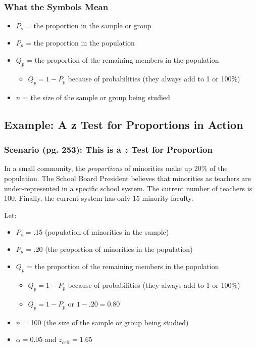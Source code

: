 \documentclass[]{article}
\begin{document}
\subsubsection{What the Symbols Mean}\label{what-the-symbols-mean}

\begin{itemize}
\itemsep1pt\parskip0pt
\item
  $P_s$ = the proportion in the sample or group
\item
  $P_p$ = the proportion in the population
\item
  $Q_p$ = the proportion of the remaining members in the population

  \begin{itemize}
  \itemsep1pt\parskip0pt
  \item
    $Q_p = 1-P_p$ because of probabilities (they always add to 1 or
    100\%)
  \end{itemize}
\item
  $n$ = the size of the sample or group being studied
\end{itemize}

\subsection{Example: A z Test for Proportions in
Action}\label{example-a-z-test-for-proportions-in-action}

\subsubsection{Scenario (pg. 253): This is a $z$ Test for
Proportion}\label{scenario-pg.-253-this-is-a-z-test-for-proportion}

In a small community, the \emph{proportions} of minorities make up 20\%
of the population. The School Board President believes that minorities
as teachers are under-represented in a specific school system. The
current number of teachers is 100. Finally, the current system has only
15 minority faculty.

Let:

\begin{itemize}
\itemsep1pt\parskip0pt
\item
  $P_s$ = .15 (population of minorities in the sample)
\item
  $P_p$ = .20 (the proportion of minorities in the population)
\item
  $Q_p$ = the proportion of the remaining members in the population

  \begin{itemize}
  \itemsep1pt\parskip0pt
  \item
    $Q_p = 1-P_p$ because of probabilities (they always add to 1 or
    100\%)
  \item
    $Q_p = 1-P_p$ or $1 - .20 = 0.80$
  \end{itemize}
\item
  $n$ = 100 (the size of the sample or group being studied)
\item
  $\alpha = 0.05$ and $z_{crit}=1.65$
\end{itemize}
\end{document}
